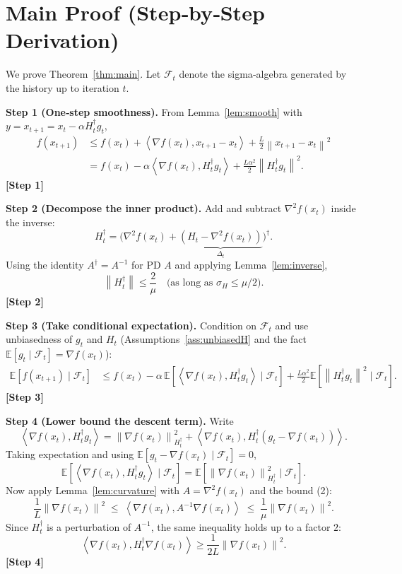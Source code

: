 \documentclass{article}
\newcommand{\E}{\mathbb{E}}
\newcommand{\norm}[1]{\left\|#1\right\|}
\newcommand{\ip}[2]{\left\langle #1,#2\right\rangle}
\newcommand{\step}[1]{\textbf{[Step #1]}}
\begin{document}
\section*{Main Proof (Step‑by‑Step Derivation)}
We prove Theorem~\ref{thm:main}. Let $\mathcal{F}_t$ denote the sigma‑algebra generated by the history up to iteration $t$.

\bigskip
\noindent\textbf{Step 1 (One‑step smoothness).}  
From Lemma~\ref{lem:smooth} with $y=x_{t+1}=x_t-\alpha H_t^{\dagger}g_t$,
\begin{align}
f(x_{t+1})
&\le f(x_t)+\ip{\nabla f(x_t)}{x_{t+1}-x_t}
     +\frac{L}{2}\norm{x_{t+1}-x_t}^{2}\nonumber\\
&= f(x_t)-\alpha\ip{\nabla f(x_t)}{H_t^{\dagger}g_t}
     +\frac{L\alpha^{2}}{2}\norm{H_t^{\dagger}g_t}^{2}.
\tag{1}
\end{align}
\step{1}

\noindent\textbf{Step 2 (Decompose the inner product).}  
Add and subtract $\nabla^{2}f(x_t)$ inside the inverse:
\[
H_t^{\dagger}= \bigl(\nabla^{2}f(x_t)+\underbrace{(H_t-\nabla^{2}f(x_t))}_{\Delta_t}\bigr)^{\dagger}.
\]
Using the identity $A^{\dagger}=A^{-1}$ for PD $A$ and applying Lemma~\ref{lem:inverse},
\[
\norm{H_t^{\dagger}}\le \frac{2}{\mu}\quad\text{(as long as }\sigma_H\le\mu/2\text{).}
\tag{2}
\]
\step{2}

\noindent\textbf{Step 3 (Take conditional expectation).}  
Condition on $\mathcal{F}_t$ and use unbiasedness of $g_t$ and $H_t$ (Assumptions~\ref{ass:unbiasedH} and the fact $\E[g_t\mid\mathcal{F}_t]=\nabla f(x_t)$):
\begin{align}
\E\!\left[f(x_{t+1})\mid\mathcal{F}_t\right]
&\le f(x_t)-\alpha\,\E\!\left[\ip{\nabla f(x_t)}{H_t^{\dagger}g_t}\mid\mathcal{F}_t\right]
   +\frac{L\alpha^{2}}{2}\E\!\left[\norm{H_t^{\dagger}g_t}^{2}\mid\mathcal{F}_t\right].
\tag{3}
\end{align}
\step{3}

\noindent\textbf{Step 4 (Lower bound the descent term).}  
Write
\[
\ip{\nabla f(x_t)}{H_t^{\dagger}g_t}
 =\norm{\nabla f(x_t)}^{2}_{H_t^{\dagger}}
    +\ip{\nabla f(x_t)}{H_t^{\dagger}(g_t-\nabla f(x_t))}.
\]
Taking expectation and using $\E[g_t-\nabla f(x_t)\mid\mathcal{F}_t]=0$,
\[
\E\!\left[\ip{\nabla f(x_t)}{H_t^{\dagger}g_t}\mid\mathcal{F}_t\right]
   =\E\!\left[\norm{\nabla f(x_t)}^{2}_{H_t^{\dagger}}\mid\mathcal{F}_t\right].
\tag{4}
\]
Now apply Lemma~\ref{lem:curvature} with $A=\nabla^{2}f(x_t)$ and the bound (2):
\[
\frac{1}{L}\norm{\nabla f(x_t)}^{2}
\;\le\;
\ip{\nabla f(x_t)}{A^{-1}\nabla f(x_t)}
\;\le\;
\frac{1}{\mu}\norm{\nabla f(x_t)}^{2}.
\]
Since $H_t^{\dagger}$ is a perturbation of $A^{-1}$, the same inequality holds up to a factor $2$:
\[
\ip{\nabla f(x_t)}{H_t^{\dagger}\nabla f(x_t)}\ge \frac{1}{2L}\norm{\nabla f(x_t)}^{2}.
\tag{5}
\]
\step{4}
\end{document}
